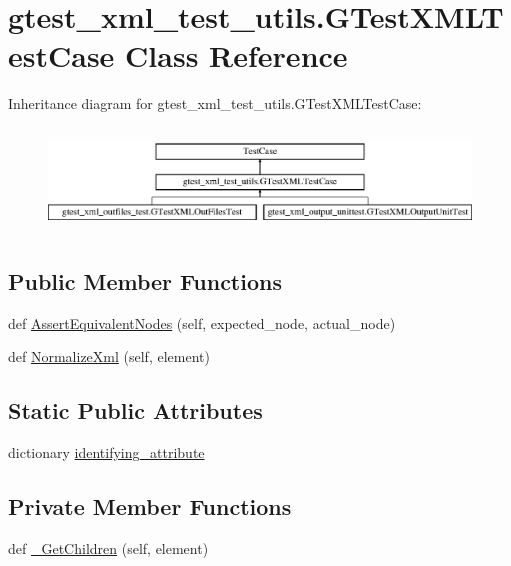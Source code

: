 \hypertarget{classgtest__xml__test__utils_1_1_g_test_x_m_l_test_case}{}\section{gtest\+\_\+xml\+\_\+test\+\_\+utils.\+G\+Test\+X\+M\+L\+Test\+Case Class Reference}
\label{classgtest__xml__test__utils_1_1_g_test_x_m_l_test_case}
Inheritance diagram for gtest\+\_\+xml\+\_\+test\+\_\+utils.\+G\+Test\+X\+M\+L\+Test\+Case\+:\begin{figure}[H]
\begin{center}
\leavevmode
\includegraphics[height=2.781457cm]{d9/daf/classgtest__xml__test__utils_1_1_g_test_x_m_l_test_case}
\end{center}
\end{figure}
\subsection*{Public Member Functions}
\begin{DoxyCompactItemize}
\item 
def \mbox{\hyperlink{classgtest__xml__test__utils_1_1_g_test_x_m_l_test_case_a977273e8863f4f41d121bb5a64b08d32}{Assert\+Equivalent\+Nodes}} (self, expected\+\_\+node, actual\+\_\+node)
\item 
def \mbox{\hyperlink{classgtest__xml__test__utils_1_1_g_test_x_m_l_test_case_ac4823e96c3b5327b25a340a3605447d9}{Normalize\+Xml}} (self, element)
\end{DoxyCompactItemize}
\subsection*{Static Public Attributes}
\begin{DoxyCompactItemize}
\item 
dictionary \mbox{\hyperlink{classgtest__xml__test__utils_1_1_g_test_x_m_l_test_case_a0e3a4e84e18f29d2248dcd670a0a6ae6}{identifying\+\_\+attribute}}
\end{DoxyCompactItemize}
\subsection*{Private Member Functions}
\begin{DoxyCompactItemize}
\item 
def \mbox{\hyperlink{classgtest__xml__test__utils_1_1_g_test_x_m_l_test_case_a7f487435d29e1b2300af000d36ff4f5e}{\+\_\+\+Get\+Children}} (self, element)
\end{DoxyCompactItemize}


